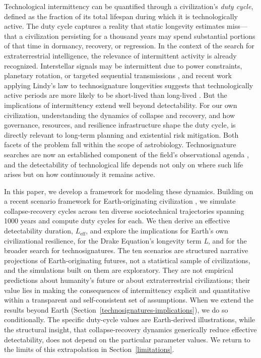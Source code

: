 Technological intermittency can be quantified through a civilization's \emph{duty cycle}, defined as the fraction of its total lifespan during which it is technologically active. The duty cycle captures a reality that static longevity estimates miss---that a civilization persisting for a thousand years may spend substantial portions of that time in dormancy, recovery, or regression. In the context of the search for extraterrestrial intelligence, the relevance of intermittent activity is already recognized. Interstellar signals may be intermittent due to power constraints, planetary rotation, or targeted sequential transmissions \citep{Gray2020-cn}, and recent work applying Lindy's law to technosignature longevities suggests that technologically active periods are more likely to be short-lived than long-lived \citep{Balbi2024-bg}. But the implications of intermittency extend well beyond detectability. For our own civilization, understanding the dynamics of collapse and recovery, and how governance, resources, and resilience infrastructure shape the duty cycle, is directly relevant to long-term planning and existential risk mitigation. Both facets of the problem fall within the scope of astrobiology. Technosignature searches are now an established component of the field's observational agenda \citep{Haqq-Misra2025-rt}, and the detectability of technological life depends not only on where such life arises but on how continuously it remains active.

In this paper, we develop a framework for modeling these dynamics. Building on a recent scenario framework for Earth-originating civilization \citep{Haqq-Misra2025-rt}, we simulate collapse-recovery cycles across ten diverse sociotechnical trajectories spanning 1000 years and compute duty cycles for each. We then derive an effective detectability duration, $L_{\mathrm{eff}}$, and explore the implications for Earth's own civilizational resilience, for the Drake Equation's longevity term \emph{L}, and for the broader search for technosignatures. The ten scenarios are structured narrative projections of Earth-originating futures, not a statistical sample of civilizations, and the simulations built on them are exploratory. They are not empirical predictions about humanity's future or about extraterrestrial civilizations; their value lies in making the consequences of intermittency explicit and quantitative within a transparent and self-consistent set of assumptions. When we extend the results beyond Earth (Section~\ref{technosignatures-implications}), we do so conditionally. The specific duty-cycle values are Earth-derived illustrations, while the structural insight, that collapse-recovery dynamics generically reduce effective detectability, does not depend on the particular parameter values. We return to the limits of this extrapolation in Section~\ref{limitations}.
